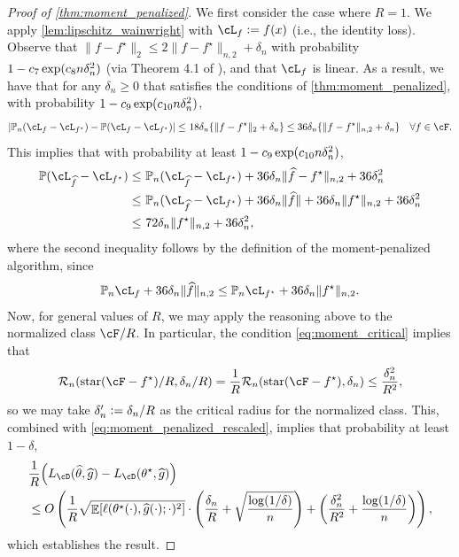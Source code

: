 \documentclass[11pt]{article} %
\newcommand{\pref}[1]{\cref{#1}}
\theoremstyle{theorem}  %
\theoremstyle{plain}
\DeclarePairedDelimiter{\brk}{[}{]}
\DeclarePairedDelimiter{\prn}{(}{)}
\DeclareMathOperator{\En}{\mathbb{E}}
\newcommand{\ldef}{\vcentcolon=}
\newcommand{\wh}[1]{\widehat{#1}}
\newcommand{\Pn}{\ensuremath{\mathbb{P}}}
\newcommand{\sh}{\ensuremath{\mathrm{star}}}
\newcommand{\Radexp}{\mathcal{R}_n}
\newcommand{\poprisk}{L_{\cD}}
\newcommand{\estone}{\wh{g}}
\newcommand{\esttwo}{\wh{\theta}}
\newcommand{\besttwo}{\theta^{\star}}
\renewcommand{\hat}[1]{\wh{#1}}
\newcommand{\fstar}{f^{\star}}
\begin{document}
\begin{proof}[Proof of \pref{thm:moment_penalized}]
  We first consider the case where $R=1$.  We apply
  \pref{lem:lipschitz_wainwright} with $\cL_f\ldef{}f(x)$ (i.e., the
  identity loss). Observe that $\|f-f^{\star}\|_{2} \leq 2
  \|f-f^{\star}\|_{n,2}+\delta_n$ with probability $1-c_7\exp\prn{c_8
    n \delta_n^2}$ (via Theorem 4.1 of \cite{wainwright2019}), and
  that $\cL_{f}$ is linear. As a result, we have that for any $\delta_n\geq 0$ that satisfies the conditions of \pref{thm:moment_penalized}, with probability $1-c_9 \exp\prn{c_{10} n \delta_n^2}$,
\begin{align*}
\left| \Pn_n (\cL_{f} - \cL_{f^{\star}}) - \Pn (\cL_{f}- \cL_{f^{\star}}) \right| \leq~& 18 \delta_n \{\|f-f^{\star}\|_{2} + \delta_n\}\leq 36 \delta_n \{\|f-f^{\star}\|_{n, 2} + \delta_n\} & \forall f \in \cF.
\end{align*}
This implies that with probability at least $1-c_9 \exp\prn{c_{10} n \delta_n^2}$, 
\begin{align*}
\Pn (\cL_{\hat{f}}- \cL_{f^{\star}}) \leq~& \Pn_n (\cL_{\hat{f}} - \cL_{f^{\star}}) + 36 \delta_n \|\hat{f}-f^{\star}\|_{n, 2} + 36\delta_n^2\\
\leq~& \Pn_n (\cL_{\hat{f}} - \cL_{f^{\star}}) + 36 \delta_n \|\hat{f}\| + 36\delta_n\|f^{\star}\|_{n, 2} + 36\delta_n^2\\
\leq~& 72 \delta_n \|f^{\star}\|_{n, 2} + 36 \delta_n^2,
\end{align*}
where the second inequality follows by the definition of the moment-penalized algorithm, since
\begin{equation}
  \label{eq:moment_penalized_rescaled}
\Pn_n \cL_{f} + 36 \delta_n \|\hat{f}\|_{n, 2} \leq  \Pn_n \cL_{f^{\star}} + 36 \delta_n \|f^{\star}\|_{n, 2}.
\end{equation}
Now, for general values of $R$, we may apply the reasoning above to the normalized class $\cF/R$. In particular, the condition \pref{eq:moment_critical} implies that
\[
  \Radexp(\sh(\cF-\fstar)/R,\delta_n/R)
  = \frac{1}{R}\Radexp(\sh(\cF-\fstar),\delta_n)\leq{} \frac{\delta_n^{2}}{R^{2}},
\]
so we may take $\delta_n'\ldef{}\delta_n/R$ as the critical radius for
the normalized class. %
This, combined with \pref{eq:moment_penalized_rescaled}, implies that probability at least $1-\delta$,
\begin{align*}
&\frac{1}{R}\prn*{\poprisk(\esttwo, \estone) - \poprisk(\besttwo, \estone)} \\&\leq O\left(\frac{1}{R}\sqrt{\En\brk*{\ell(\besttwo(\cdot), \estone(\cdot); \cdot)^2}}\cdot\left(\frac{\delta_n}{R}+\sqrt{\frac{\log(1/\delta)}{n}}\right) + \left(\frac{\delta_n^2}{R^{2}}+\frac{\log(1/\delta)}{n}\right)\right),
\end{align*}
which establishes the result.
\end{proof}
%
%
\end{document}
